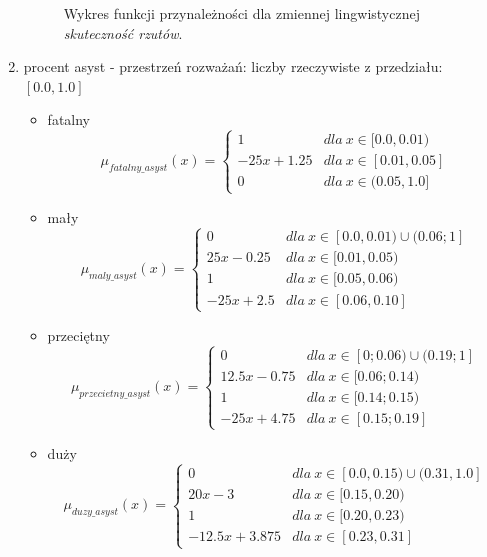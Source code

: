 \documentclass{classrep}
\begin{document}
\begin{enumerate}
\begin{figure}[H]
        \caption{Wykres funkcji przynależności dla zmiennej lingwistycznej \textit{skuteczność rzutów}.}
        \label{rysunek:skutecznosc}
    \end{figure}
    \item procent asyst - przestrzeń rozważań: liczby rzeczywiste z przedziału: $[0.0, 1.0]$
    \begin{itemize}
        \item fatalny
        \begin{equation}
            \mu_{fatalny\_asyst}(x) = \left\{\begin{matrix} 1 & dla \: x\in[0.0, 0.01) \\ -25x + 1.25 & dla \: x\in [0.01, 0.05] \\ 0 & dla \: x\in (0.05, 1.0] \end{matrix}\right.
        \end{equation}
        \item mały
        \begin{equation}
            \mu_{maly\_asyst}(x) = \left\{\begin{matrix} 0 & dla \: x\in [0.0, 0.01) \cup (0.06;1] \\ 25x-0.25 & dla \: x\in[0.01, 0.05) \\ 1 & dla \: x\in [0.05, 0.06) \\ -25x + 2.5 & dla \: x\in[0.06, 0.10] \end{matrix}\right.
        \end{equation}
        \item przeciętny
        \begin{equation}
            \mu_{przecietny\_asyst}(x) = \left\{\begin{matrix} 0 & dla \: x\in [0;0.06) \cup (0.19;1] \\ 12.5x - 0.75 & dla \: x\in[0.06;0.14) \\ 1 & dla \: x\in [0.14; 0.15) \\ -25x + 4.75 & dla \: x\in[0.15;0.19] \end{matrix}\right.
        \end{equation}
        \item duży
        \begin{equation}
            \mu_{duzy\_asyst}(x) = \left\{\begin{matrix} 0 & dla \: x\in [0.0, 0.15) \cup (0.31, 1.0] \\ 20x - 3 & dla \: x\in[0.15, 0.20) \\ 1 & dla \: x\in [0.20, 0.23) \\ -12.5x + 3.875 & dla \: x\in[0.23, 0.31] \end{matrix}\right.

\end{equation}
\end{itemize}
\end{enumerate}
\end{document}
